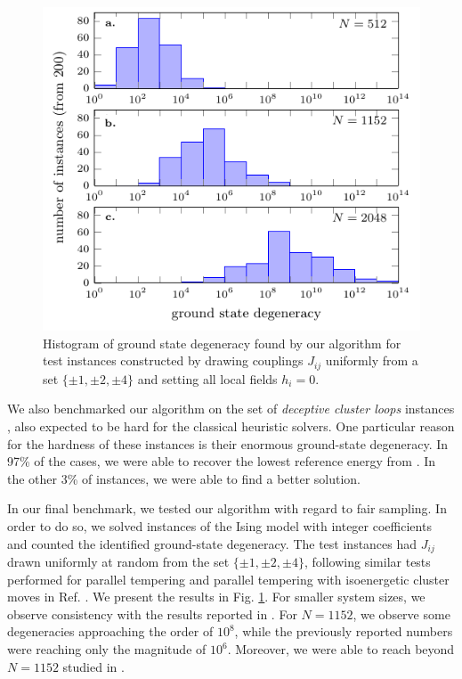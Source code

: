 \begin{figure}
  \includegraphics[width=\textwidth]{figures/tn-ground-degeneracy_overlay.pdf}
  \caption{Histogram of ground state degeneracy found by our algorithm for test instances
    constructed by drawing couplings $J_{ij}$ uniformly from a set $\{\pm 1, \pm 2,
        \pm 4\}$ and setting all local fields $h_{i} = 0$.}
  \label{fig:ground-degeneracy}
\end{figure}

We also benchmarked our algorithm on the set of \emph{deceptive cluster loops}
instances \cite{helmut_deceptive_2018}, also expected to be hard for the
classical heuristic solvers. One particular reason for the hardness of these
instances is their enormous ground-state degeneracy. In 97\% of the cases, we
were able to recover the lowest reference energy from
\cite{helmut_deceptive_2018}. In the other 3\% of instances, we were able to
find a better solution.



In our final benchmark, we tested our algorithm with regard to fair sampling.
In order to do so, we solved instances of the Ising model with integer
coefficients and counted the identified ground-state degeneracy. The test
instances had $J_{ij}$ drawn uniformly at random from the set $\{\pm 1, \pm 2,
    \pm 4\}$, following similar tests performed for parallel tempering and parallel
tempering with isoenergetic cluster moves \cite{Zhu_PT+ICM_2015} in Ref.
\cite{zhu_fair_2019}. We present the results in Fig.
\ref{fig:ground-degeneracy}. For smaller system sizes, we observe consistency
with the results reported in \cite{zhu_fair_2019}. For $N=1152$, we observe
some degeneracies approaching the order of $10^{8}$, while the previously
reported numbers were reaching only the magnitude of $10^{6}$. Moreover, we
were able to reach beyond $N=1152$ studied in \cite{zhu_fair_2019}.



